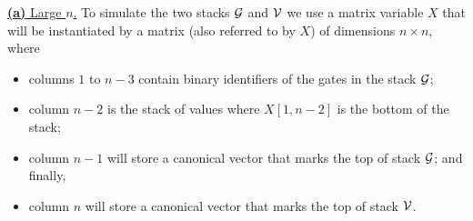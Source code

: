 \bigskip
\noindent
\underline{\textbf{(a)} Large $n$.}
 To simulate the two stacks $\mathcal{G}$ and $\mathcal{V}$ we use a matrix variable $X$ that will be instantiated by a matrix (also referred to by $X$) of dimensions $n \times n$, where
    \begin{itemize}
        \item columns $1$ to $n-3$ contain binary identifiers of the gates in the stack $\mathcal{G}$;
        \item column $n-2$ is the stack of values where $X[1, n-2]$ is the bottom of the stack;
        \item column $n-1$ will store a canonical vector that marks the top of stack $\mathcal{G}$; and finally,
        \item column $n$ will store a canonical vector that marks the top of stack $\mathcal{V}$.
    \end{itemize}

